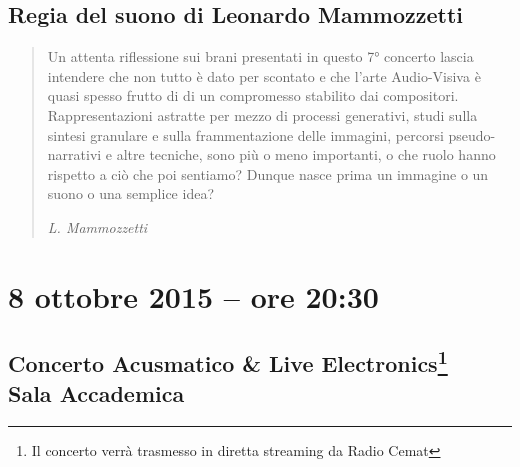 \documentclass[8pt, twoside, a5paper]{extreport}
\begin{document}
{\fontsize{30}{30} }

\subsection*{\textsf{Regia del suono di Leonardo Mammozzetti}}

\begin{quote}
{\svolk \small
Un attenta riflessione sui brani presentati in questo 7° concerto lascia intendere che non tutto è dato per scontato e che l'arte Audio-Visiva è quasi spesso frutto di di un compromesso stabilito dai compositori. Rappresentazioni astratte per mezzo di processi generativi, studi sulla sintesi granulare e sulla frammentazione delle immagini, percorsi pseudo-narrativi e altre tecniche, sono più o meno importanti, o che ruolo hanno rispetto a ciò che poi sentiamo? 
Dunque nasce prima un immagine o un suono o una semplice idea?}

\emph{L. Mammozzetti}
\end{quote}    



\smallskip

\begin{multicols}{2}




\end{multicols}

\clearpage

\section*{8 ottobre 2015 -- ore 20:30}

\subsection*{{\small Concerto Acusmatico \& Live Electronics\footnote{ Il concerto verrà trasmesso in diretta streaming da Radio Cemat}} \\
	\textsf{Sala Accademica}}
\end{document}
